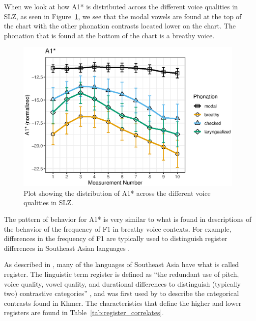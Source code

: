When we look at how A1* is distributed across the different voice qualities in SLZ, as seen in Figure~\ref{fig:a1}, we see that the modal vowels are found at the top of the chart with the other phonation contrasts located lower on the chart. The phonation that is found at the bottom of the chart is a breathy voice. 
\begin{figure}[h!]
    \centering
    \includegraphics[width = 0.9\linewidth]{images/slz_a1c.eps}
    \caption{Plot showing the distribution of A1* across the different voice qualities in SLZ.}
    \label{fig:a1}
\end{figure}

The pattern of behavior for A1* is very similar to what is found in descriptions of the behavior of the frequency of F1 in breathy voice contexts. For example, differences in the frequency of F1 are typically used to distinguish register differences in Southeast Asian languages \citep{brunelleRegisterEasternCham2005,brunelleDialectExperiencePerceptual2012,brunelleTonePhonationSoutheast2016}.

As described in \citet{brunelleTonePhonationSoutheast2016}, many of the languages of Southeast Asia have what is called register. The linguistic term register is defined as ``the redundant use of pitch, voice quality, vowel quality, and durational differences to distinguish (typically two) contrastive categories'' \citep[193]{brunelleTonePhonationSoutheast2016}, and was first used by \citet{hendersonMainFeaturesCambodian1952} to describe the categorical contrasts found in Khmer. The characteristics that define the higher and lower registers are found in Table~\ref{tab:register_correlates}.

